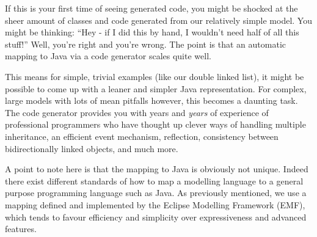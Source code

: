 If this is your first time of seeing generated code, you might be shocked at the sheer amount of classes and code generated from our relatively simple model.
You might be thinking: ``Hey - if I did this by hand, I wouldn't need half of all this stuff!''  Well, you're right and you're wrong. The point is that an
automatic mapping to Java via a code generator scales quite well.

This means for simple, trivial examples (like our double linked list), it might be possible to come up with a leaner and simpler Java representation. For
complex, large models with lots of mean pitfalls however, this becomes a daunting task.
The code generator provides you with years and \emph{years} of experience of professional programmers who have thought up clever ways of handling multiple
inheritance, an efficient event mechanism, reflection, consistency between bidirectionally linked objects, and much more.

A point to note here is that the mapping to Java is obviously not unique. Indeed there exist different standards of how to map a modelling language to a
general purpose programming language such as Java. As previously mentioned, we use a mapping defined and implemented by the Eclipse Modelling Framework (EMF),
which tends to favour efficiency and simplicity over expressiveness and advanced features.
